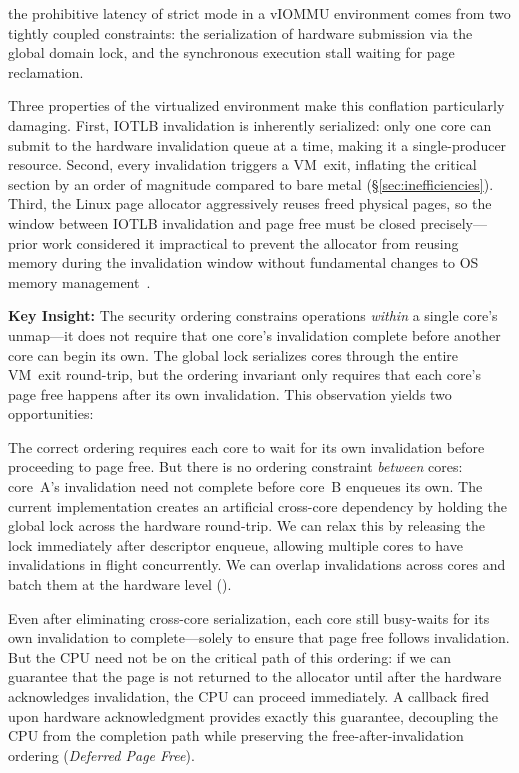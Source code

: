 the prohibitive latency of strict mode in a vIOMMU environment comes from two tightly coupled constraints: the serialization of hardware submission via the global domain lock, and the synchronous execution stall waiting for page reclamation. 

Three properties of the virtualized environment make this conflation particularly damaging. First, IOTLB invalidation is inherently serialized: only one core can submit to the hardware invalidation queue at a time, making it a single-producer resource. Second, every invalidation triggers a VM~exit, inflating the critical section by an order of magnitude compared to bare metal (\S\ref{sec:inefficiencies}).
Third, the Linux page allocator aggressively reuses freed physical pages, so the window between IOTLB invalidation and page free must be closed precisely---prior work considered it impractical to prevent the allocator from reusing memory during the invalidation window without fundamental changes to OS memory management~\cite{Amit2011vIOMMU}.


\textbf{Key Insight:} The security ordering constrains operations \emph{within} a single core's unmap---it does not require that one core's invalidation complete before another core can begin its own. The global lock serializes cores through the entire VM~exit round-trip, but the ordering invariant only requires that each core's page free happens after its own invalidation. This observation yields two opportunities:

The correct ordering requires each core to wait for its own invalidation before proceeding to page free. But there is no ordering constraint \emph{between} cores: core~A's invalidation need not complete before core~B enqueues its own. The current implementation creates an artificial cross-core dependency by holding the global lock across the hardware round-trip. We can relax this by releasing the lock immediately after descriptor enqueue, allowing multiple cores to have invalidations in flight concurrently. We can overlap invalidations across cores and batch them at the hardware level (\emph{\optOneHeading}).

Even after eliminating cross-core serialization, each core still busy-waits for its own invalidation to complete---solely to ensure that page free follows invalidation. But the CPU need not be on the critical path of this ordering: if we can guarantee that the page is not returned to the allocator until after the hardware acknowledges invalidation, the CPU can proceed immediately. A callback fired upon hardware acknowledgment provides exactly this guarantee, decoupling the CPU from the completion path while preserving the free-after-invalidation ordering (\emph{Deferred Page Free}).

